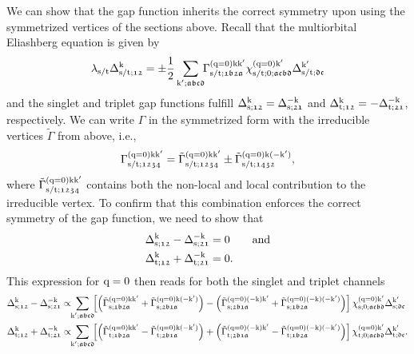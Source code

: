 \documentclass[main.tex]{subfiles}
\begin{document}
We can show that the gap function inherits the correct symmetry upon using the symmetrized vertices of the sections above. Recall that the multiorbital Eliashberg equation is given by 
\begin{align}
	\lambda_{\text{s}/\text{t}}\Delta_{\text{s}/\text{t};\mathfrak{12}}^{\text{k}}=\pm\frac{1}{2}\sum_{\text{k}';\mathfrak{abcd}}\!\!\Gamma^{(\text{q}=0)\text{k}\text{k}'}_{\text{s}/\text{t};\mathfrak{1b2a}}\chi^{(\text{q}=0)\text{k}'}_{\text{s}/\text{t};0;\mathfrak{acbd}}\Delta_{\text{s}/\text{t};\mathfrak{dc}}^{\text{k}'}
\end{align}
and the singlet and triplet gap functions fulfill $\Delta_{\text{s};\mathfrak{12}}^{\text{k}}=\Delta_{\text{s};\mathfrak{21}}^{-\text{k}}$ and $\Delta_{\text{t};\mathfrak{12}}^{\text{k}}=-\Delta_{\text{t};\mathfrak{21}}^{-\text{k}}$, respectively. 
We can write $\Gamma$ in the symmetrized form with the irreducible vertices $\tilde{\Gamma}$ from above, i.e.,
\begin{align}\label{eq:symmetrization_pairing_vertex}
	\Gamma^{(\text{q}=0)\text{k}\text{k}'}_{\text{s}/\text{t};\mathfrak{1234}} = \tilde{\Gamma}^{(\text{q}=0)\text{k}\text{k}'}_{\text{s}/\text{t};\mathfrak{1234}}\pm \tilde{\Gamma}^{(\text{q}=0)\text{k}(-\text{k}')}_{\text{s}/\text{t};\mathfrak{1432}},
\end{align}
where $\tilde{\Gamma}^{(\text{q}=0)\text{k}\text{k}'}_{\text{s}/\text{t};\mathfrak{1234}}$ contains both the non-local and local contribution to the irreducible vertex. To confirm that this combination enforces the correct symmetry of the gap function, we need to show that
\begin{subequations}
\begin{align}
	\Delta_{\text{s};\mathfrak{12}}^{\text{k}}-\Delta_{\text{s};\mathfrak{21}}^{-\text{k}}&=0\qquad\text{and}\\
	\Delta_{\text{t};\mathfrak{12}}^{\text{k}}+\Delta_{\text{t};\mathfrak{21}}^{-\text{k}}&=0.
\end{align}
\end{subequations}
This expression for $\text{q}=0$ then reads for both the singlet and triplet channels
\begin{subequations}
\begin{align}
	\Delta_{\sing;\mathfrak{12}}^{\k}-\Delta_{\sing;\mathfrak{21}}^{-\k}&\propto\!\!\sum_{\kp;\mathfrak{abcd}}\!\! \left [\left (\tilde{\Gamma}^{(\q=0)\k\kp}_{\sing;\mathfrak{1b2a}}+\tilde{\Gamma}^{(\q=0)\k(-\kp)}_{\sing;\mathfrak{2b1a}}\right )-\left(\tilde{\Gamma}^{(\q=0)(-\k)\kp}_{\sing;\mathfrak{2b1a}}+\tilde{\Gamma}^{(\q=0)(-\k)(-\kp)}_{\sing;\mathfrak{1b2a}}\right )\right ]\chi^{(\q=0)\kp}_{\sing;0;\mathfrak{acbd}}\Delta_{\sing;\mathfrak{dc}}^{\kp}\label{eq:symmetrization_delta_first_formula_singlet}\\
	\Delta_{\trip;\mathfrak{12}}^{\k}+\Delta_{\trip;\mathfrak{21}}^{-\k}&\propto\!\!\sum_{\kp;\mathfrak{abcd}}\!\! \left [\left (\tilde{\Gamma}^{(\q=0)\k\kp}_{\trip;\mathfrak{1b2a}}-\tilde{\Gamma}^{(\q=0)\k(-\kp)}_{\trip;\mathfrak{2b1a}}\right )+\left(\tilde{\Gamma}^{(\q=0)(-\k)\kp}_{\trip;\mathfrak{2b1a}}-\tilde{\Gamma}^{(\q=0)(-\k)(-\kp)}_{\trip;\mathfrak{1b2a}}\right )\right ]\chi^{(\q=0)\kp}_{\trip;0;\mathfrak{acbd}}\Delta_{\trip;\mathfrak{dc}}^{\kp}\label{eq:symmetrization_delta_first_formula_triplet}.
\end{align}
\end{subequations}
\end{document}
